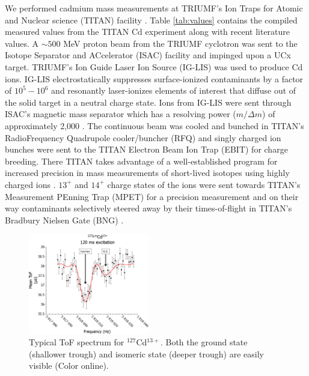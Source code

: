 \documentclass[twocolumn,prc,showpacs,preprintnumbers,amsmath,amssymb,superscriptaddress,nofootinbib,aps,10pt]{revtex4-1}
\begin{document}
We performed cadmium mass measurements at \mbox{TRIUMF's} Ion Traps for Atomic and Nuclear science (TITAN) facility \cite{Dilling2006}. Table \ref{tab:values} contains the compiled measured values from the TITAN Cd experiment along with recent literature values.  A $\sim 500$ MeV proton beam from the TRIUMF cyclotron was sent to the Isotope Separator and ACcelerator (ISAC) facility \cite{Dombsky2000} and impinged upon a UCx target. TRIUMF's Ion Guide Laser Ion Source (IG-LIS) \cite{Raeder2014} was used to produce Cd ions. IG-LIS electrostatically suppresses surface-ionized contaminants by a factor of $10^{5}-10^{6}$ and resonantly laser-ionizes elements of interest that diffuse out of the solid target in a neutral charge state. Ions from IG-LIS were sent through ISAC's magnetic mass separator which has a resolving power ($m/\Delta m$) of approximately 2,000 \cite{Bricault2014}. The continuous beam was cooled and bunched in TITAN's RadioFrequency Quadrupole cooler/buncher (RFQ) \cite{Brunner2012a} and singly charged ion bunches were sent to the TITAN Electron Beam Ion Trap (EBIT) \cite{Lapierre2010} for charge breeding. There TITAN takes advantage of a well-established program for increased precision in mass measurements of short-lived isotopes using highly charged ions \cite{Ettenauer2011}. $13^+$ and $14^+$ charge states of the ions were sent towards TITAN's Measurement PEnning Trap (MPET) \cite{Dilling2003} for a precision measurement and on their way contaminants selectively steered away by their times-of-flight in TITAN's Bradbury Nielsen Gate (BNG) \cite{Brunner2012}.

\begin{figure}[ht]
    \begin{center}
        \includegraphics[width=0.47\textwidth]{127Cd.png}
        \caption{Typical ToF spectrum for $^{127}$Cd$^{13+}$. Both the ground state (shallower trough) and isomeric state (deeper trough) are easily visible (Color online).}
        \label{fig:spectra}
    \end{center}
\end{figure}
\end{document}

